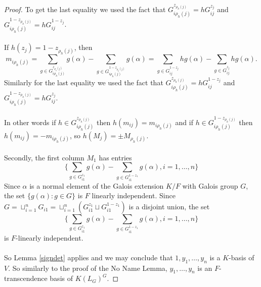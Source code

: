\documentclass[12pt]{article}
\theoremstyle{plain}
\begin{document}
\begin{proof}
To get the last equality we used the fact that $G^{z_{\rho_h(j)}}_{i\rho_{h}(j)}= hG^{z_j}_{ij}$ and $G^{1- z_{\rho_h(j)}}_{i\rho_h(j)}= hG^{1-z_j}_{ij}$.\\
\\
If  $h(z_j) = 1- z_{\rho_h(j)}$, then 
$$m_{i\rho_h(j)} =  \sum_{g\in G^{z_{\rho_h(j)}}_{i\rho_h(j)}}g(\alpha) -\sum_{g\in G^{1-z_{\rho_h(j)}}_{i\rho_h(j)}}g(\alpha) = \sum_{g\in G^{1-z_j}_{ij}}hg(\alpha) -\sum_{g\in G^{z_j}_{ij}}hg(\alpha).$$
Similarly for the last equality we used the fact that $G^{z_{\rho_h(j)}}_{i\rho_{h}(j)}= hG^{1-z_j}_{ij}$ and $G^{1- z_{\rho_h(j)}}_{i\rho_h(j)}= hG^{z_j}_{ij}$.\\
\\
In other words if $h \in G^{z_{\rho_h(j)}}_{i\rho_h(j)}$ then $h(m_{ij}) = m_{i\rho_h(j)}$ and if $h \in G^{1-z_{\rho_h(j)}}_{i\rho_h(j)}$ then $h(m_{ij}) = -m_{i\rho_h(j)}$, so $h(M_j) = \pm M_{\rho_h(j)}$.
\\
\\
Secondly, the first column $M_1$ has entries 
$$\lbrace\sum_{g \in G^{z_1}_{i1}}g(\alpha)- \sum_{g \in G^{1- z_1}_{i1}}g(\alpha), i = 1, \ldots,n\rbrace$$
Since $\alpha$ is a normal element of the Galois extension $K/F$ with Galois group $G$, the set $\lbrace g(\alpha): g \in G \rbrace$ is $F$ linearly independent. Since $G = \sqcup^n_{i =1}G_{i1}= \sqcup^n_{i =1}(G^{z_1}_{i1} \sqcup G^{1-z_1}_{i1}) $ is a disjoint union, the set 
$$\lbrace\sum_{g \in G^{z_1}_{i1}}g(\alpha)- \sum_{g \in G^{1- z_1}_{i1}}g(\alpha), i = 1, \ldots,n\rbrace$$
is $F$-linearly independent.\\
\\
So Lemma \ref{signdet} applies and we may conclude that $1, y_1, \ldots, y_n$ is a $K$-basis of $V$. So similarly to the proof of the No Name Lemma, $y_1, \ldots, y_n$ is an $F$-transcendence basis of $K(L_G)^G$.

\end{proof}
\end{document}

